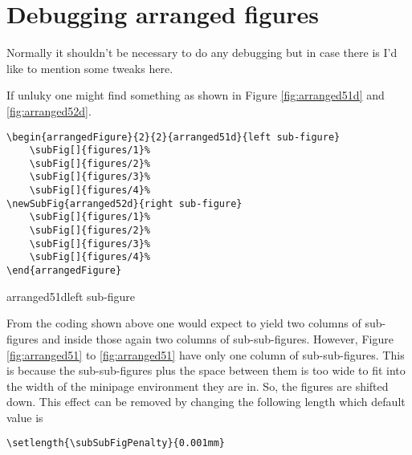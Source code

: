 \documentclass[12pt,a4paper]{article}
\begin{document}
\clearpage






\section{Debugging arranged figures}

Normally it shouldn't be necessary to do any debugging but in case there is
I'd like to mention some tweaks here.

If unluky one might find something as shown in Figure \ref{fig:arranged51d} and
\ref{fig:arranged52d}.

\setlength{\subSubFigPenalty}{-1mm} 

\begin{verbatim}
\begin{arrangedFigure}{2}{2}{arranged51d}{left sub-figure}
    \subFig[]{figures/1}%
    \subFig[]{figures/2}%
    \subFig[]{figures/3}%
    \subFig[]{figures/4}%
\newSubFig{arranged52d}{right sub-figure}
    \subFig[]{figures/1}%
    \subFig[]{figures/2}%
    \subFig[]{figures/3}%
    \subFig[]{figures/4}%
\end{arrangedFigure}
\end{verbatim}

\begin{arrangedFigure}{2}{2}{arranged51d}{left sub-figure}
\end{arrangedFigure}

From the coding shown above one would expect to yield two columns of sub-figures and
inside those again two columns of sub-sub-figures. However, Figure
\ref{fig:arranged51} to \ref{fig:arranged51} have only one column of
sub-sub-figures. This is because the sub-sub-figures plus the space
between them is too wide to fit into the width of the minipage environment
they are in. So, the figures are shifted down. This effect can be removed
by changing the following length which default value is

\begin{verbatim}
\setlength{\subSubFigPenalty}{0.001mm}
\end{verbatim}

\setlength{\subSubFigPenalty}{0.001mm}
\end{document}

